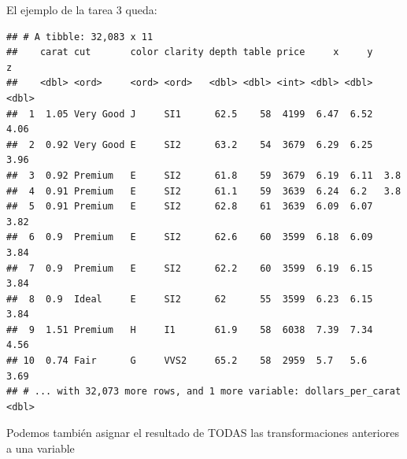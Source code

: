 \documentclass[]{book}
\newenvironment{Shaded}{\begin{snugshade}}{\end{snugshade}}
\newcommand{\KeywordTok}[1]{\textcolor[rgb]{0.13,0.29,0.53}{\textbf{#1}}}
\newcommand{\DataTypeTok}[1]{\textcolor[rgb]{0.13,0.29,0.53}{#1}}
\newcommand{\DecValTok}[1]{\textcolor[rgb]{0.00,0.00,0.81}{#1}}
\newcommand{\StringTok}[1]{\textcolor[rgb]{0.31,0.60,0.02}{#1}}
\newcommand{\CommentTok}[1]{\textcolor[rgb]{0.56,0.35,0.01}{\textit{#1}}}
\newcommand{\OperatorTok}[1]{\textcolor[rgb]{0.81,0.36,0.00}{\textbf{#1}}}
\newcommand{\NormalTok}[1]{#1}
\theoremstyle{definition}
\theoremstyle{definition}
\theoremstyle{definition}
\theoremstyle{remark}
\begin{document}
El ejemplo de la tarea 3 queda:

\begin{Shaded}
\end{Shaded}

\begin{verbatim}
## # A tibble: 32,083 x 11
##    carat cut       color clarity depth table price     x     y     z
##    <dbl> <ord>     <ord> <ord>   <dbl> <dbl> <int> <dbl> <dbl> <dbl>
##  1  1.05 Very Good J     SI1      62.5    58  4199  6.47  6.52  4.06
##  2  0.92 Very Good E     SI2      63.2    54  3679  6.29  6.25  3.96
##  3  0.92 Premium   E     SI2      61.8    59  3679  6.19  6.11  3.8 
##  4  0.91 Premium   E     SI2      61.1    59  3639  6.24  6.2   3.8 
##  5  0.91 Premium   E     SI2      62.8    61  3639  6.09  6.07  3.82
##  6  0.9  Premium   E     SI2      62.6    60  3599  6.18  6.09  3.84
##  7  0.9  Premium   E     SI2      62.2    60  3599  6.19  6.15  3.84
##  8  0.9  Ideal     E     SI2      62      55  3599  6.23  6.15  3.84
##  9  1.51 Premium   H     I1       61.9    58  6038  7.39  7.34  4.56
## 10  0.74 Fair      G     VVS2     65.2    58  2959  5.7   5.6   3.69
## # ... with 32,073 more rows, and 1 more variable: dollars_per_carat <dbl>
\end{verbatim}

Podemos también asignar el resultado de TODAS las transformaciones
anteriores a una variable

\begin{Shaded}
\end{Shaded}
\end{document}
